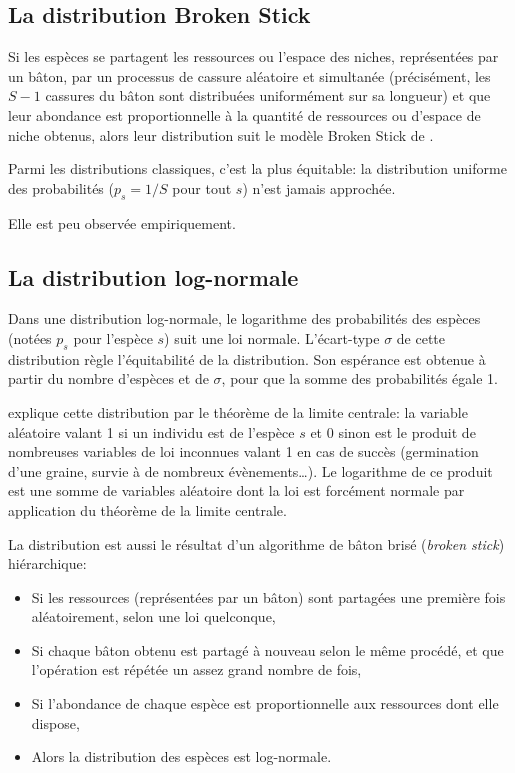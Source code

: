 \documentclass[
  11pt,
  french,
  a4paper,
  extrafontsizes,onecolumn,openright
  ]{memoir}
\providecommand{\tightlist}{%
  \setlength{\itemsep}{0pt}\setlength{\parskip}{0pt}}
\begin{document}
\hypertarget{la-distribution-broken-stick}{%
\subsection{La distribution Broken Stick}\label{la-distribution-broken-stick}}

Si les espèces se partagent les ressources ou l'espace des niches, représentées par un bâton, par un processus de cassure aléatoire et simultanée (précisément, les \(S-1\) cassures du bâton sont distribuées uniformément sur sa longueur) et que leur abondance est proportionnelle à la quantité de ressources ou d'espace de niche obtenus, alors leur distribution suit le modèle Broken Stick de \textcite{MacArthur1957}.

Parmi les distributions classiques, c'est la plus équitable: la distribution uniforme des probabilités (\(p_s=1/S\) pour tout \(s\)) n'est jamais approchée.

Elle est peu observée empiriquement.

\hypertarget{la-distribution-log-normale}{%
\subsection{La distribution log-normale}\label{la-distribution-log-normale}}

Dans une distribution log-normale, le logarithme des probabilités des espèces (notées \(p_s\) pour l'espèce \(s\)) suit une loi normale.
L'écart-type \(\sigma\) de cette distribution règle l'équitabilité de la distribution.
Son espérance est obtenue à partir du nombre d'espèces et de \(\sigma\), pour que la somme des probabilités égale 1.

\textcite{May1975} explique cette distribution par le théorème de la limite centrale: la variable aléatoire valant 1 si un individu est de l'espèce \(s\) et 0 sinon est le produit de nombreuses variables de loi inconnues valant 1 en cas de succès (germination d'une graine, survie à de nombreux évènements\ldots).
Le logarithme de ce produit est une somme de variables aléatoire dont la loi est forcément normale par application du théorème de la limite centrale.

La distribution est aussi le résultat d'un algorithme de bâton brisé (\emph{broken stick}) hiérarchique\autocite{Bulmer1974}:

\begin{itemize}
\tightlist
\item
  Si les ressources (représentées par un bâton) sont partagées une première fois aléatoirement, selon une loi quelconque,
\item
  Si chaque bâton obtenu est partagé à nouveau selon le même procédé, et que l'opération est répétée un assez grand nombre de fois,
\item
  Si l'abondance de chaque espèce est proportionnelle aux ressources dont elle dispose,
\item
  Alors la distribution des espèces est log-normale.
\end{itemize}
\end{document}
